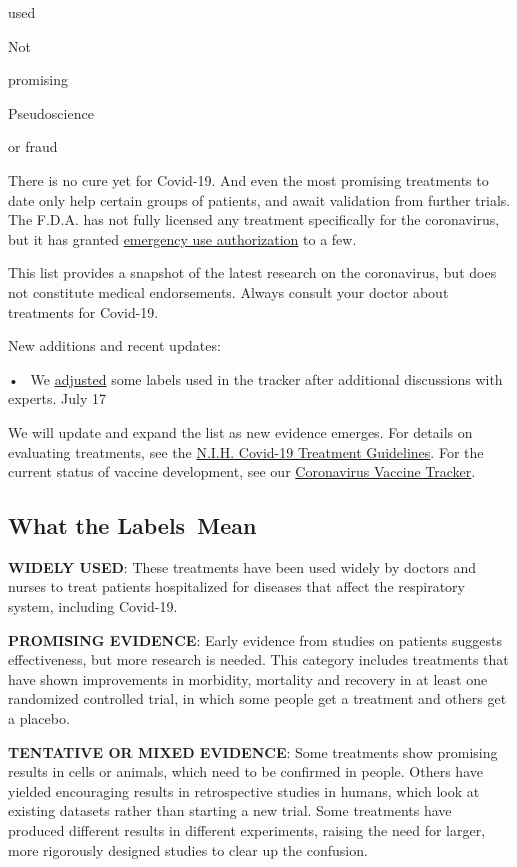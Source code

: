 used

Not

promising

Pseudoscience

or fraud

There is no cure yet for Covid-19. And even the most promising
treatments to date only help certain groups of patients, and await
validation from further trials. The F.D.A. has not fully licensed any
treatment specifically for the coronavirus, but it has granted
\href{https://www.fda.gov/emergency-preparedness-and-response/mcm-legal-regulatory-and-policy-framework/emergency-use-authorization}{emergency
use authorization} to a few.

This list provides a snapshot of the latest research on the coronavirus,
but does not constitute medical endorsements. Always consult your doctor
about treatments for Covid-19.

New additions and recent updates:

•~ We \protect\hyperlink{note}{adjusted} some labels used in the tracker
after additional discussions with experts. July 17

We will update and expand the list as new evidence emerges. For details
on evaluating treatments, see the
\href{https://www.covid19treatmentguidelines.nih.gov/}{N.I.H. Covid-19
Treatment Guidelines}. For the current status of vaccine development,
see our
\href{https://www.nytimes3xbfgragh.onion/interactive/2020/science/coronavirus-vaccine-tracker.html}{Coronavirus
Vaccine Tracker}.

\hypertarget{what-the-labels-mean}{%
\subsection{What the Labels~Mean}\label{what-the-labels-mean}}

\textbf{WIDELY USED}: These treatments have been used widely by doctors
and nurses to treat patients hospitalized for diseases that affect the
respiratory system, including Covid-19.

\textbf{PROMISING EVIDENCE}: Early evidence from studies on patients
suggests effectiveness, but more research is needed. This category
includes treatments that have shown improvements in morbidity, mortality
and recovery in at least one randomized controlled trial, in which some
people get a treatment and others get a placebo.

\textbf{TENTATIVE OR MIXED EVIDENCE}: Some treatments show promising
results in cells or animals, which need to be confirmed in people.
Others have yielded encouraging results in retrospective studies in
humans, which look at existing datasets rather than starting a new
trial. Some treatments have produced different results in different
experiments, raising the need for larger, more rigorously designed
studies to clear up the confusion.

